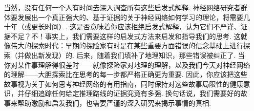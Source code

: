 当然，没有任何一个人有时间去深入调查所有这些启发式解释. 神经网络研究者群体要发展出一个真正强大的、基于证据的关于神经网络如何学习的理论，将需要几十年（或更长时间）. 这是否意味着你应该拒绝启发式解释，认为它们不严谨、证据不足？不！事实上，我们需要这样的启发式方法来启发和指导我们的思考. 这就像伟大的探索时代：早期的探险家有时是在某些重要方面错误的信念基础上进行探索（并做出新发现）的. 后来，随着我们填补了地理知识，那些错误被纠正了. 当你对某件事理解得很差时——就像探险家对地理的理解，以及我们今天对神经网络的理解——大胆探索比在思考的每一步都严格正确更为重要. 因此，你应该把这些故事视为关于如何思考神经网络的有用指南，同时保持对这些故事局限性的健康意识，并仔细追踪任何给定推理路线的证据究竟有多强. 换句话说，我们需要好的故事来帮助激励和启发我们，也需要严谨的深入研究来揭示事情的真相.
